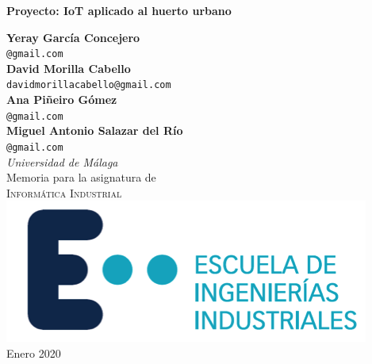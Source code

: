 \begin{titlepage}
\begin{center}
 {\huge\bfseries Proyecto: IoT aplicado al huerto urbano}
 \vspace{2.5cm}
    
 {\large\bfseries  Yeray García Concejero}\\[5pt]
 \texttt{@gmail.com}\\[14pt]
 
  {\large\bfseries David Morilla Cabello}\\[5pt]
 \texttt{davidmorillacabello@gmail.com}\\[14pt]
 
  {\large\bfseries Ana Piñeiro Gómez}\\[5pt]
 \texttt{@gmail.com}\\[14pt]
 
  {\large\bfseries Miguel Antonio Salazar del Río}\\[5pt]
 \texttt{@gmail.com}\\[14pt]
 
 \vspace{2cm}
\emph{{Universidad de Málaga}}\\[2cm]
{Memoria para la asignatura de} \\[2cm]
\textsc{\Large{{Informática Industrial}}} \\[5pt]

 \vfill
\includegraphics[scale=0.75]{figuras/logoUMA.png}\\[5pt]
 \vfill
{Enero 2020}
\end{center}
\end{titlepage}